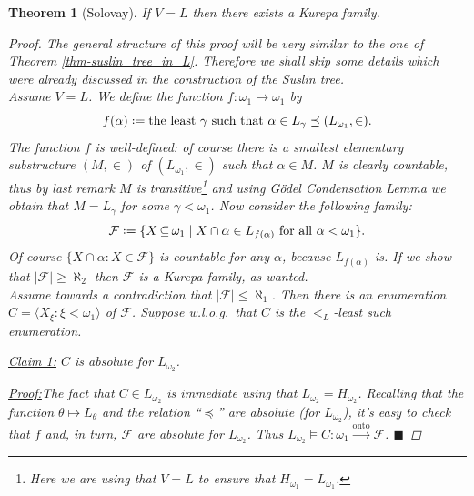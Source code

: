 \documentclass[11pt,a4paper]{report}
\newtheorem{theorem}{Theorem}[chapter] %
\theoremstyle{definition}
\theoremstyle{num.custom-title}
\theoremstyle{custom-title}
\newenvironment{claim}[1]{\par\noindent\underline{Claim#1:}\space}{} %
\newenvironment{claimproof}[1]{\par\noindent\underline{Proof:}\space#1}{\leavevmode\unskip\penalty9999 \hbox{}\nobreak\hfill\quad\hbox{$\blacksquare$}} %
\DeclareMathOperator{\sse}{\subseteq}
\newcommand{\F}{\mathcal{F}}
\newcommand{\onto}{\xrightarrow{\text{onto}}}
\newcommand*{\defeq}{\mathrel{\rlap{%
                     \raisebox{0.3ex}{$\cdot$}}%
                     \raisebox{-0.3ex}{$\cdot$}}%
                     =}
\begin{document}
\begin{theorem}[Solovay]\label{thm-kurepa_family_in_L}
If $V=L$ then there exists a Kurepa family.
\begin{proof}
The general structure of this proof will be very similar to the one of Theorem \ref{thm-suslin_tree_in_L}. Therefore we shall skip some details which were already discussed in the construction of the Suslin tree.\\
Assume $V=L$. We define the function $f \colon \omega_1 \to \omega_1$ by
\[
f(\alpha) \defeq \text{the least $\gamma$ such that } \alpha \in L_\gamma \preceq (L_{\omega_1}, \in).
\]
The function $f$ is well-defined: of course there is a smallest elementary substructure $(M,\in)$ of $(L_{\omega_1},\in)$ such that $\alpha \in M$. $M$ is clearly countable, thus by last remark $M$ is transitive\footnote{Here we are using that $V=L$ to ensure that $H_{\omega_1} = L_{\omega_1}$.} and using Gödel Condensation Lemma we obtain that $M=L_\gamma$ for some $\gamma < \omega_1$. Now consider the following family:
\[
\F \defeq \{ X \sse \omega_1 \mid X \cap \alpha \in L_{f(\alpha)} \text{ for all } \alpha < \omega_1 \}.
\]
Of course $\{ X \cap \alpha : X \in \F \}$ is countable for any $\alpha$, because $L_{f(\alpha)}$ is. If we show that $|\F| \geq \aleph_2$ then $\F$ is a Kurepa family, as wanted.\\
Assume towards a contradiction that $|\F| \leq \aleph_1$. Then there is an enumeration $C = \langle X_\xi : \xi < \omega_1 \rangle$ of $\F$. Suppose w.l.o.g.\ that $C$ is the $<_L$-least such enumeration.

\begin{claim}{ 1}
$C$ is absolute for $L_{\omega_2}$.
\begin{claimproof}
The fact that $C \in L_{\omega_2}$ is immediate using that $L_{\omega_2} = H_{\omega_2}$. Recalling that the function $\theta \mapsto L_\theta$ and the relation ``$\preceq$'' are absolute (for $L_{\omega_2}$), it's easy to check that $f$ and, in turn, $\F$ are absolute for $L_{\omega_2}$. Thus $L_{\omega_2} \models C \colon \omega_1 \onto \F$.
\end{claimproof}
\end{claim}


\end{proof}
\end{theorem}
\end{document}
